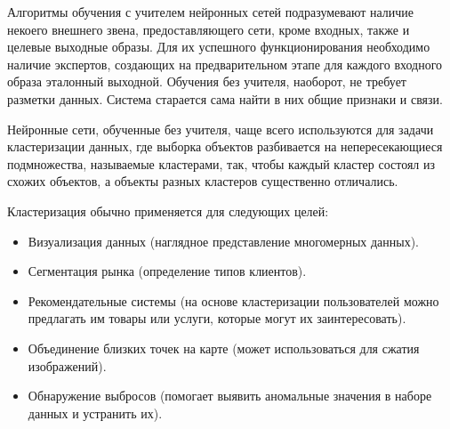 \documentclass[bachelor, och, referat]{SCWorks}
\begin{document}




\tableofcontents

\intro 
Алгоритмы обучения с учителем нейронных сетей подразумевают наличие некоего внешнего звена, 
предоставляющего сети, кроме входных, также и целевые выходные образы. 
Для их успешного функционирования необходимо наличие экспертов, 
создающих на предварительном этапе для каждого входного образа эталонный выходной. 
Обучения без учителя, наоборот, не требует разметки данных. 
Система старается сама найти в них общие признаки и связи.

Нейронные сети, обученные без учителя, чаще всего используются
для задачи кластеризации данных, где выборка объектов разбивается на непересекающиеся подмножества, 
называемые кластерами, так, чтобы каждый кластер состоял из схожих объектов, 
а объекты разных кластеров существенно отличались. 

Кластеризация обычно применяется для следующих целей:
\begin{itemize}
    \item Визуализация данных (наглядное представление многомерных данных).
    \item Сегментация рынка (определение типов клиентов).
    \item Рекомендательные системы (на основе кластеризации пользователей можно предлагать им товары или услуги, которые могут их заинтересовать).
    \item Объединение близких точек на карте (может использоваться для сжатия изображений).
    \item Обнаружение выбросов (помогает выявить аномальные значения в наборе данных и устранить их).
\end{itemize}
\end{document}

